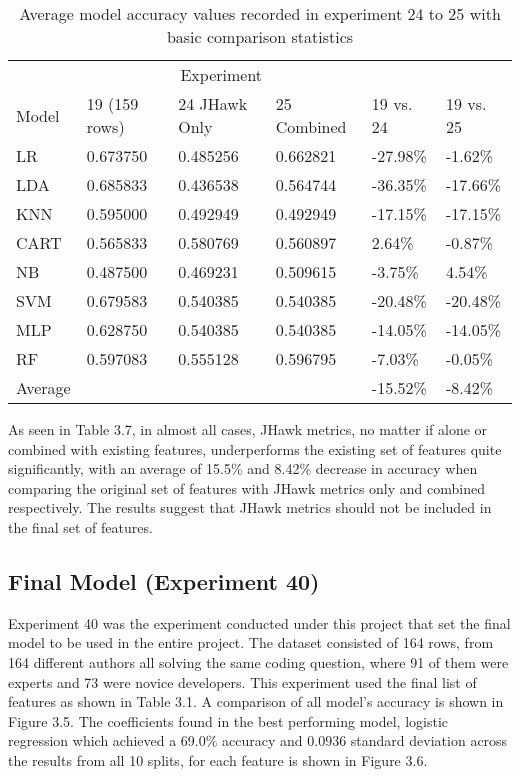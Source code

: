\documentclass{report}
\begin{document}
\begin{table}[h!]
\centering
\begin{tabular}{l|lll|ll}
\hline
& \multicolumn{3}{c|}{Experiment} & & \\
Model & 19 (159 rows) & 24 JHawk Only & 25 Combined & 19 vs. 24 & 19 vs. 25 \\
\hline
LR & 0.673750 & 0.485256 & 0.662821 & -27.98\% & -1.62\% \\
LDA & 0.685833 & 0.436538 & 0.564744 & -36.35\% & -17.66\% \\
KNN & 0.595000 & 0.492949 & 0.492949 & -17.15\% & -17.15\% \\
CART & 0.565833 & 0.580769 & 0.560897 & 2.64\% & -0.87\% \\
NB & 0.487500 & 0.469231 & 0.509615 & -3.75\% & 4.54\% \\
SVM & 0.679583 & 0.540385 & 0.540385 & -20.48\% & -20.48\% \\
MLP & 0.628750 & 0.540385 & 0.540385 & -14.05\% & -14.05\% \\
RF & 0.597083 & 0.555128 & 0.596795 & -7.03\% & -0.05\% \\
\hline
Average &  &  &  & -15.52\% & -8.42\% \\
\hline
\end{tabular}
\caption{Average model accuracy values recorded in experiment 24 to 25 with basic comparison statistics}
\label{tab:3.7}
\end{table}

As seen in Table 3.7, in almost all cases, JHawk metrics, no matter if alone or combined with existing features, underperforms the existing set of features quite significantly, with an average of 15.5\% and 8.42\% decrease in accuracy when comparing the original set of features with JHawk metrics only and combined respectively. The results suggest that JHawk metrics should not be included in the final set of features.

\subsection{Final Model (Experiment 40)}

Experiment 40 was the experiment conducted under this project that set the final model to be used in the entire project. The dataset consisted of 164 rows, from 164 different authors all solving the same coding question, where 91 of them were experts and 73 were novice developers. This experiment used the final list of features as shown in Table 3.1. A comparison of all model’s accuracy is shown in Figure 3.5. The coefficients found in the best performing model, logistic regression which achieved a 69.0\% accuracy and 0.0936 standard deviation across the results from all 10 splits, for each feature is shown in Figure 3.6.
\end{document}

